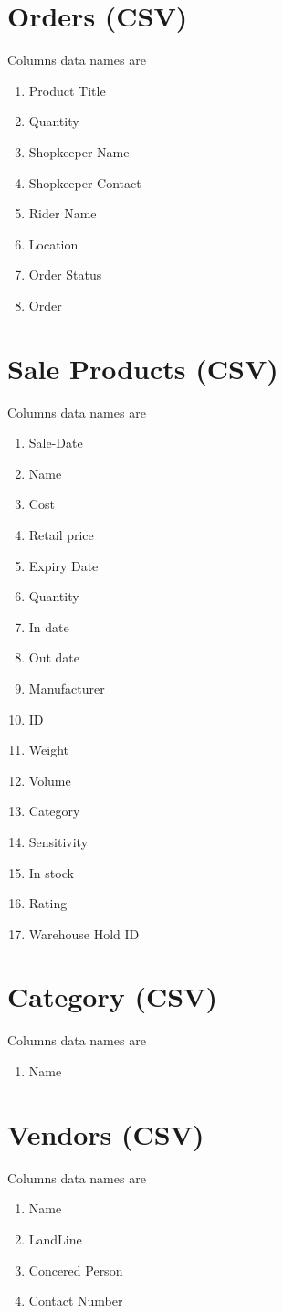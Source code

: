 \documentclass[12pt,a4paper]{report}
\begin{document}
\section{Orders (CSV)}
Columns data names are
\begin{enumerate}
\item Product Title
\item Quantity
\item Shopkeeper Name
\item Shopkeeper Contact 
\item Rider Name 
\item Location 
\item Order Status
\item Order 
\end{enumerate}

\section{Sale Products (CSV)}
Columns data names are
\begin{enumerate}
\item Sale-Date    
\item Name
\item Cost
\item Retail price
\item Expiry Date
\item Quantity
\item In date 
\item Out date
\item Manufacturer 
\item ID
\item Weight
\item Volume
\item Category
\item Sensitivity
\item In stock
\item Rating
\item Warehouse Hold ID
\end{enumerate}

\section{Category (CSV)}
Columns data names are
\begin{enumerate} 
\item Name
\end{enumerate}

\section{Vendors (CSV)}
Columns data names are
\begin{enumerate}
\item Name
\item LandLine
\item Concered Person 
\item Contact Number
\end{enumerate}
\end{document}
